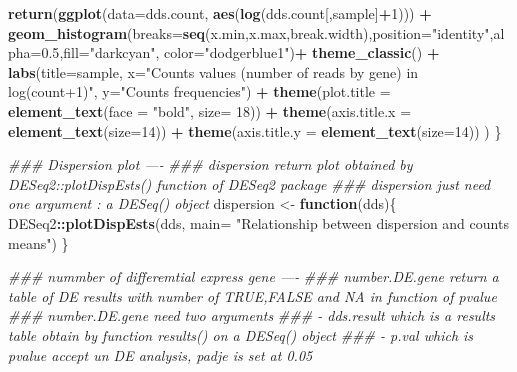 \documentclass[
  12pt,
]{article}
\newenvironment{Shaded}{\begin{snugshade}}{\end{snugshade}}
\newcommand{\CommentTok}[1]{\textcolor[rgb]{0.56,0.35,0.01}{\textit{#1}}}
\newcommand{\ControlFlowTok}[1]{\textcolor[rgb]{0.13,0.29,0.53}{\textbf{#1}}}
\newcommand{\DataTypeTok}[1]{\textcolor[rgb]{0.13,0.29,0.53}{#1}}
\newcommand{\DecValTok}[1]{\textcolor[rgb]{0.00,0.00,0.81}{#1}}
\newcommand{\FloatTok}[1]{\textcolor[rgb]{0.00,0.00,0.81}{#1}}
\newcommand{\KeywordTok}[1]{\textcolor[rgb]{0.13,0.29,0.53}{\textbf{#1}}}
\newcommand{\NormalTok}[1]{#1}
\newcommand{\OperatorTok}[1]{\textcolor[rgb]{0.81,0.36,0.00}{\textbf{#1}}}
\newcommand{\StringTok}[1]{\textcolor[rgb]{0.31,0.60,0.02}{#1}}
\begin{document}
\begin{Shaded}
\begin{Highlighting}[]
  \KeywordTok{return}\NormalTok{(}\KeywordTok{ggplot}\NormalTok{(}\DataTypeTok{data=}\NormalTok{dds.count, }\KeywordTok{aes}\NormalTok{(}\KeywordTok{log}\NormalTok{(dds.count[,sample]}\OperatorTok{+}\DecValTok{1}\NormalTok{))) }\OperatorTok{+}\StringTok{ }
\StringTok{           }\KeywordTok{geom_histogram}\NormalTok{(}\DataTypeTok{breaks=}\KeywordTok{seq}\NormalTok{(x.min,x.max,break.width),}\DataTypeTok{position=}\StringTok{"identity"}\NormalTok{,}\DataTypeTok{alpha=}\FloatTok{0.5}\NormalTok{,}\DataTypeTok{fill=}\StringTok{"darkcyan"}\NormalTok{, }
                          \DataTypeTok{color=}\StringTok{"dodgerblue1"}\NormalTok{)}\OperatorTok{+}
\StringTok{           }\KeywordTok{theme_classic}\NormalTok{() }\OperatorTok{+}
\StringTok{           }\KeywordTok{labs}\NormalTok{(}\DataTypeTok{title=}\NormalTok{sample, }
                \DataTypeTok{x=}\StringTok{"Counts values (number of reads by gene) in log(count+1)"}\NormalTok{,}
                \DataTypeTok{y=}\StringTok{"Counts frequencies"}\NormalTok{) }\OperatorTok{+}
\StringTok{           }\KeywordTok{theme}\NormalTok{(}\DataTypeTok{plot.title =} \KeywordTok{element_text}\NormalTok{(}\DataTypeTok{face =} \StringTok{"bold"}\NormalTok{, }\DataTypeTok{size=} \DecValTok{18}\NormalTok{)) }\OperatorTok{+}
\StringTok{           }\KeywordTok{theme}\NormalTok{(}\DataTypeTok{axis.title.x =} \KeywordTok{element_text}\NormalTok{(}\DataTypeTok{size=}\DecValTok{14}\NormalTok{)) }\OperatorTok{+}
\StringTok{           }\KeywordTok{theme}\NormalTok{(}\DataTypeTok{axis.title.y =} \KeywordTok{element_text}\NormalTok{(}\DataTypeTok{size=}\DecValTok{14}\NormalTok{))}
\NormalTok{  )}
\NormalTok{\}}






\CommentTok{### Dispersion plot ----}
\CommentTok{### dispersion return plot obtained by DESeq2::plotDispEsts() function of DESeq2 package}
\CommentTok{### dispersion just need one argument : a DESeq() object}
\NormalTok{dispersion <-}\StringTok{ }\ControlFlowTok{function}\NormalTok{(dds)\{}
\NormalTok{  DESeq2}\OperatorTok{::}\KeywordTok{plotDispEsts}\NormalTok{(dds, }\DataTypeTok{main=} \StringTok{"Relationship between dispersion and counts means"}\NormalTok{)}
\NormalTok{\}}


\CommentTok{### nummber of differemtial express gene ----}
\CommentTok{### number.DE.gene return a table of DE results with number of TRUE,FALSE and NA in function of pvalue}
\CommentTok{### number.DE.gene need two arguments}
\CommentTok{###   - dds.result which is a results table obtain by function results() on a DESeq() object}
\CommentTok{###   - p.val which is pvalue accept un DE analysis, padje is set at 0.05}


\end{Highlighting}
\end{Shaded}
\end{document}
